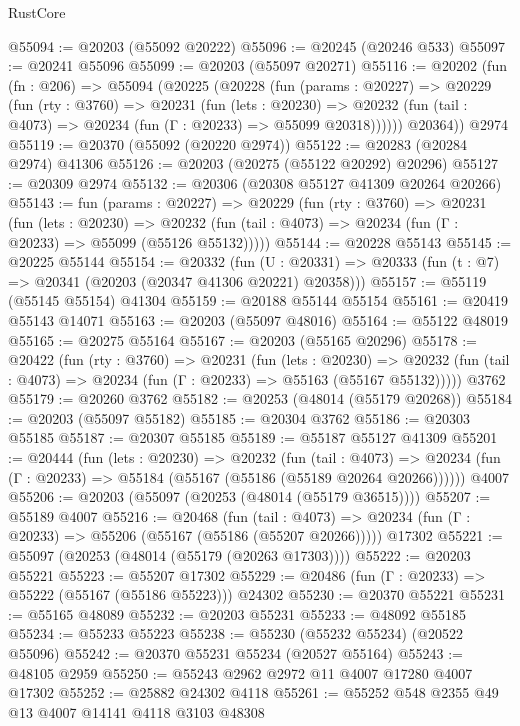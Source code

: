 \begin{lexlean}{RustCore}
\begin{coremodule}
@55094 := @20203 (@55092 @20222)
@55096 := @20245 (@20246 @533)
@55097 := @20241 @55096
@55099 := @20203 (@55097 @20271)
@55116 := @20202
    (fun (fn : @206) =>
    @55094
      (@20225
        (@20228
          (fun (params : @20227) =>
          @20229
            (fun (rty : @3760) =>
            @20231
              (fun (lets : @20230) =>
              @20232 (fun (tail : @4073) => @20234 (fun (Γ : @20233) => @55099 @20318))))))
        @20364))
    @2974
@55119 := @20370 (@55092 (@20220 @2974))
@55122 := @20283 (@20284 @2974) @41306
@55126 := @20203 (@20275 (@55122 @20292) @20296)
@55127 := @20309 @2974
@55132 := @20306 (@20308 @55127 @41309 @20264 @20266)
@55143 := fun (params : @20227) =>
  @20229
    (fun (rty : @3760) =>
    @20231
      (fun (lets : @20230) =>
      @20232 (fun (tail : @4073) => @20234 (fun (Γ : @20233) => @55099 (@55126 @55132)))))
@55144 := @20228 @55143
@55145 := @20225 @55144
@55154 := @20332
    (fun (U : @20331) => @20333 (fun (t : @7) => @20341 (@20203 (@20347 @41306 @20221) @20358)))
@55157 := @55119 (@55145 @55154) @41304
@55159 := @20188 @55144 @55154
@55161 := @20419 @55143 @14071
@55163 := @20203 (@55097 @48016)
@55164 := @55122 @48019
@55165 := @20275 @55164
@55167 := @20203 (@55165 @20296)
@55178 := @20422
    (fun (rty : @3760) =>
    @20231
      (fun (lets : @20230) =>
      @20232 (fun (tail : @4073) => @20234 (fun (Γ : @20233) => @55163 (@55167 @55132)))))
    @3762
@55179 := @20260 @3762
@55182 := @20253 (@48014 (@55179 @20268))
@55184 := @20203 (@55097 @55182)
@55185 := @20304 @3762
@55186 := @20303 @55185
@55187 := @20307 @55185
@55189 := @55187 @55127 @41309
@55201 := @20444
    (fun (lets : @20230) =>
    @20232
      (fun (tail : @4073) =>
      @20234 (fun (Γ : @20233) => @55184 (@55167 (@55186 (@55189 @20264 @20266))))))
    @4007
@55206 := @20203 (@55097 (@20253 (@48014 (@55179 @36515))))
@55207 := @55189 @4007
@55216 := @20468
    (fun (tail : @4073) => @20234 (fun (Γ : @20233) => @55206 (@55167 (@55186 (@55207 @20266)))))
    @17302
@55221 := @55097 (@20253 (@48014 (@55179 (@20263 @17303))))
@55222 := @20203 @55221
@55223 := @55207 @17302
@55229 := @20486 (fun (Γ : @20233) => @55222 (@55167 (@55186 @55223))) @24302
@55230 := @20370 @55221
@55231 := @55165 @48089
@55232 := @20203 @55231
@55233 := @48092 @55185
@55234 := @55233 @55223
@55238 := @55230 (@55232 @55234) (@20522 @55096)
@55242 := @20370 @55231 @55234 (@20527 @55164)
@55243 := @48105 @2959
@55250 := @55243 @2962 @2972 @11 @4007 @17280 @4007 @17302
@55252 := @25882 @24302 @4118
@55261 := @55252 @548 @2355 @49 @13 @4007 @14141 @4118 @3103 @48308

\end{coremodule}
\end{lexlean}
